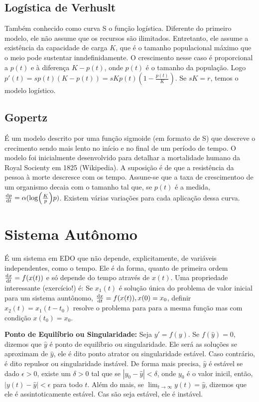 \documentclass[12pt]{article}
\begin{document}
\subsection{Logística de Verhuslt} 

Também conhecido como curva S o função logística. Diferente do primeiro
modelo, ele não assume que os
recursos são ilimitados. Entretanto, ele assume a existência da capacidade
de carga $K$, que é o tamanho populacional máximo que o meio pode
sustentar inndefinidamente. O crescimento nesse caso é proporcional a
$p(t)$ e à diferença $K - p(t)$, onde $p(t)$ é o tamanho da população.
Logo $p'(t) = sp(t)(K - p(t)) = sKp(t)(1 - \frac{p(t)}{K})$. Se $sK = r$,
temos o modelo logístico.

\subsection{Gopertz}

É um modelo descrito por uma função sigmoide (em formato de S) que descreve o
crecimento sendo mais lento no início e no final de um período de tempo. O
modelo foi inicialmente desenvolvido para detalhar a mortalidade humano da
Royal Socienty em 1825 (Wikipedia). A suposição é de que a resistência da pessoa à morte
descresce com os tempo. Assune-se que a taxa de crescimentoo de um organismo
decaia com o tamanho tal que, se $p(t)$ é a medida, $\dv{p}{t} =
\alpha(\log(\frac{K}{p})p)$. Existem várias variações para cada aplicação
dessa curva. 

\section{Sistema Autônomo}

É um sistema em EDO que não depende, explicitamente, de variáveis
independentes, como o tempo. Ele é da forma, quanto de primeira ordem
$\dv{x}{t} = f(x(t))$ e só depende do tempo através de $x(t)$. Uma propriedade
interessante (exercício!) é: Se $x_1(t)$ é solução única do problema de valor
inicial para um sistema auntônomo, $\dv{x}{t} = f(x(t)), x(0) = x_0$,
definir $x_2(t) = x_1(t - t_0)$ resolve o problema para para a mesma função
mas com condição $x(t_0) = x_0$. 

\textbf{Ponto de Equilíbrio ou Singularidade:} Seja $y' = f(y)$. Se
$f(\hat{y}) = 0$, dizemos que $\hat{y}$ é ponto de equilíbrio ou
singularidade. Ele será as soluções se aproximam de $\hat{y}$, ele é dito
ponto atrator ou singularidade estável. Caso contrário, é dito repulsor ou
singularidade instável. De forma mais precisa, $\hat{y}$ é estável se dado
$\epsilon > 0$, existe um $\delta > 0$ tal que se $|y_0 - \hat{y}| < \delta$,
onde $y_0$ é o valor inicil, então, $|y(t) - \hat{y}| < \epsilon$ para todo
$t$. Além do mais, se $\lim_{t \to \infty} y(t) = \hat{y}$, dizemos que ele é
assintoticamente estável. Cas são seja estável, ele é instável.  
\end{document}
